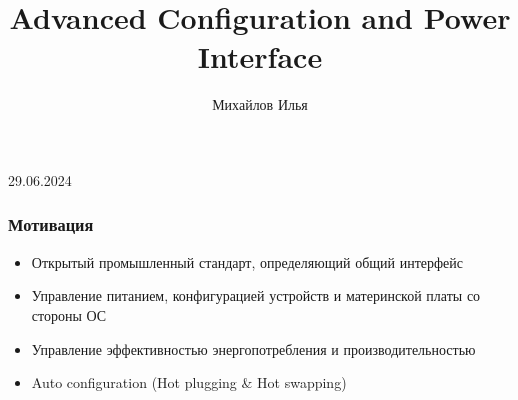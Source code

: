 \documentclass{beamer}
\title[ACPI]{Advanced Configuration and Power Interface}
\institute[]{}
\author[Михайлов Илья]{Михайлов Илья}
\begin{document}
{
\begin{frame}
	\vspace{35pt}
	\hspace{-10pt}
	\begin{center}
		\titlepage
	\end{center}

	\btVFill

	\begin{center}
		\vspace{5pt}
		\scriptsize{
			29.06.2024}
	\end{center}

\end{frame}
}

\begin{frame}
	\frametitle{Мотивация}
	\begin{itemize}
		\item Открытый промышленный стандарт, определяющий общий интерфейс
		\item Управление питанием, конфигурацией устройств и материнской платы со стороны ОС
		\item Управление эффективностью энергопотребления и производительностью
		\item Auto configuration (Hot plugging \& Hot swapping)
	\end{itemize}
\end{frame}
\end{document}
